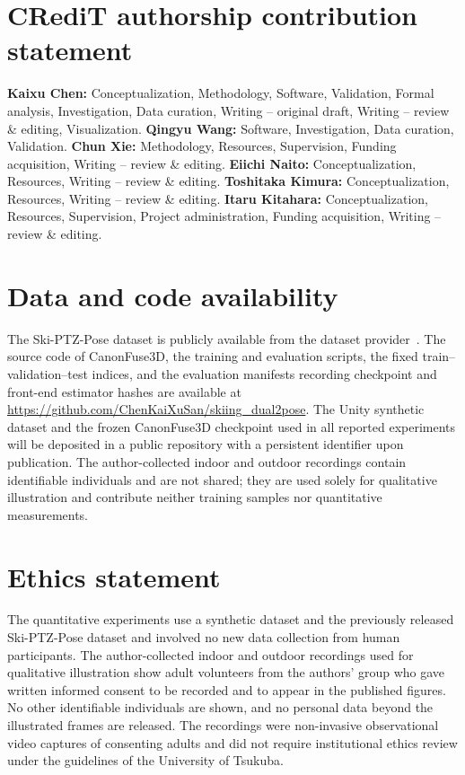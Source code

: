 \documentclass[preprint,12pt]{elsarticle}
\begin{document}
\section*{CRediT authorship contribution statement}
\textbf{Kaixu Chen:} Conceptualization, Methodology, Software, Validation, Formal analysis, Investigation, Data curation, Writing -- original draft, Writing -- review \& editing, Visualization.
\textbf{Qingyu Wang:} Software, Investigation, Data curation, Validation.
\textbf{Chun Xie:} Methodology, Resources, Supervision, Funding acquisition, Writing -- review \& editing.
\textbf{Eiichi Naito:} Conceptualization, Resources, Writing -- review \& editing.
\textbf{Toshitaka Kimura:} Conceptualization, Resources, Writing -- review \& editing.
\textbf{Itaru Kitahara:} Conceptualization, Resources, Supervision, Project administration, Funding acquisition, Writing -- review \& editing.

\section*{Data and code availability}
The Ski-PTZ-Pose dataset is publicly available from the dataset provider~\cite{ski_poseptz_dataset}. The source code of CanonFuse3D, the training and evaluation scripts, the fixed train--validation--test indices, and the evaluation manifests recording checkpoint and front-end estimator hashes are available at \url{https://github.com/ChenKaiXuSan/skiing_dual2pose}. The Unity synthetic dataset and the frozen CanonFuse3D checkpoint used in all reported experiments will be deposited in a public repository with a persistent identifier upon publication. The author-collected indoor and outdoor recordings contain identifiable individuals and are not shared; they are used solely for qualitative illustration and contribute neither training samples nor quantitative measurements.

\section*{Ethics statement}
The quantitative experiments use a synthetic dataset and the previously released Ski-PTZ-Pose dataset and involved no new data collection from human participants. The author-collected indoor and outdoor recordings used for qualitative illustration show adult volunteers from the authors' group who gave written informed consent to be recorded and to appear in the published figures. No other identifiable individuals are shown, and no personal data beyond the illustrated frames are released. The recordings were non-invasive observational video captures of consenting adults and did not require institutional ethics review under the guidelines of the University of Tsukuba.
\end{document}
